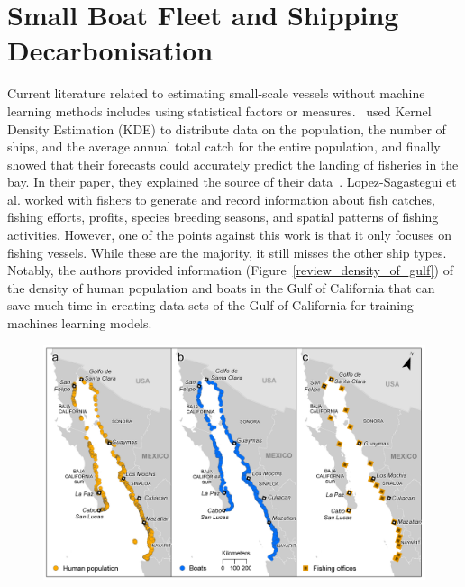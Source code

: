 \section{Small Boat Fleet and Shipping Decarbonisation}
Current literature related to estimating small-scale vessels without machine learning methods includes using statistical factors or measures.~ used Kernel Density Estimation (KDE) to distribute data on the population, the number of ships, and the average annual total catch for the entire population, and finally showed that their forecasts could accurately predict the landing of fisheries in the bay. In their paper, they explained the source of their data~\cite{Lopez-Sagastegui2017Comparing}. Lopez-Sagastegui et al. worked with fishers to generate and record information about fish catches, fishing efforts, profits, species breeding seasons, and spatial patterns of fishing activities. However, one of the points against this work is that it only focuses on fishing vessels. While these are the majority, it still misses the other ship types. Notably, the authors provided information (Figure~\ref{review_density_of_gulf}) of the density of human population and boats in the Gulf of California that can save much time in creating data sets of the Gulf of California for training machines learning models.

\begin{figure}[!t]
\center
\includegraphics[scale=0.7]{img/review_density_of_gulf.png}
\end{figure}

